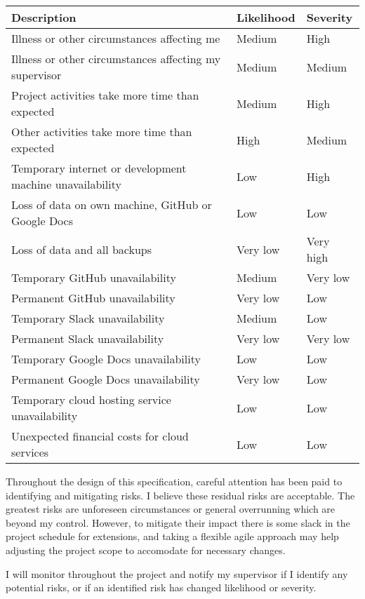 \documentclass[12pt]{article}
\begin{document}
\begin{center}\begin{tabular}{ |l|l|l| }
  \hline
  \textbf{Description} & \textbf{Likelihood} & \textbf{Severity} \\
  \hline
  Illness or other circumstances affecting me & Medium & High \\
  \hline
  Illness or other circumstances affecting my supervisor & Medium & Medium \\
  \hline
  Project activities take more time than expected & Medium & High \\
  \hline
  Other activities take more time than expected & High & Medium \\
  \hline
  Temporary internet or development machine unavailability & Low & High \\
  \hline
  Loss of data on own machine, GitHub or Google Docs & Low & Low \\
  \hline
  Loss of data and all backups & Very low & Very high \\
  \hline
  Temporary GitHub unavailability & Medium & Very low \\
  \hline
  Permanent GitHub unavailability & Very low & Low \\
  \hline
  Temporary Slack unavailability & Medium & Low \\
  \hline
  Permanent Slack unavailability & Very low & Very low \\
  \hline
  Temporary Google Docs unavailability & Low & Low \\
  \hline
  Permanent Google Docs unavailability & Very low & Low \\
  \hline
  Temporary cloud hosting service unavailability & Low & Low \\
  \hline
  Unexpected financial costs for cloud services & Low & Low \\
  \hline
\end{tabular}\end{center}

Throughout the design of this specification, careful attention has been paid to identifying and mitigating risks. I believe these residual risks are acceptable. The greatest risks are unforeseen circumstances or general overrunning which are beyond my control. However, to mitigate their impact there is some slack in the project schedule for extensions, and taking a flexible agile approach may help adjusting the project scope to accomodate for necessary changes.

I will monitor throughout the project and notify my supervisor if I identify any potential risks, or if an identified risk has changed likelihood or severity.
\end{document}
